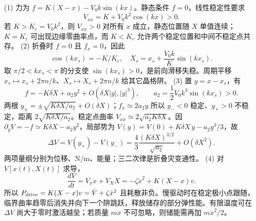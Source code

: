 (1) 力为 \(f=K(X-x)-V_0k\sin(kx)\)。静态条件 \(f=0\)，线性稳定性要求
\[
V_{xx}=K+V_0k^2\cos(kx)>0.
\]
若 \(K>K_c=V_0k^2\)，则 \(V_{xx}>0\) 对所有 \(x\) 成立，静态位置随 \(X\) 单值连续；\(K=K_c\) 可出现边缘零曲率点，而 \(K<K_c\) 允许两个稳定位置和中间不稳定点共存。
(2) 折叠时 \(f=0\) 且 \(f_x=0\)，因此
\[
\cos(kx_s)=-K/K_c,\quad
X_s=x_s+\frac{V_0k}{K}\sin(kx_s).
\]
取 \(\pi/2<kx_s<\pi\) 的分支使 \(\sin(kx_s)>0\)，是前向滑移失稳。周期平移 \(x_s\mapsto x_s+2\pi n/k\)、\(X_s\mapsto X_s+2\pi n/k\) 给其它晶格阱。
(3) 置 \(y=x-x_s\)，有
\[
f=-K\delta X+a_2 y^2+O(\delta X|y|,|y|^3),\qquad
a_2=\frac12V_0k^3\sin(kx_s)>0.
\]
两根 \(y_\pm=\pm\sqrt{K\delta X/a_2}+O(\delta X)\)；\(f_x\simeq2a_2y\) 所以 \(y_-<0\) 稳定、\(y_+>0\) 不稳定，距离 \(2\sqrt{K\delta X/a_2}\)。稳定点曲率 \(V_{xx}\simeq2\sqrt{a_2K\delta X}\)。因 \(\partial_yV=-f\simeq K\delta X-a_2y^2\)，局部势为 \(V(y)=V(0)+K\delta X\,y-a_2y^3/3\)，故
\[
\Delta V=V(y_+)-V(y_-)=\frac{4}{3}\frac{(K\delta X)^{3/2}}{\sqrt{a_2}}+O(\delta X^2).
\]
两项量纲分别为位移、\(\mathrm{N/m}\)、能量；三二次律是折叠灾变通性。
(4) 对 \(V[x(t),X(t)]\) 求导，
\[
\frac{dV}{dt}=V_x\dot x+V_X\dot X
=-\zeta\dot x^2+K(X-x)v.
\]
所以 \(P_{\rm drive}=K(X-x)v=\dot V+\zeta\dot x^2\) 且耗散非负。慢驱动时在稳定极小点跟随，临界曲率趋零后消失并向下一个阱跳跃，释放储存的部分弹性能。有限温度可在 \(\Delta V\) 尚大于零时激活越垒；若质量 \(m\ddot x\) 不可忽略，则储能需再加 \(m\dot x^2/2\)。
